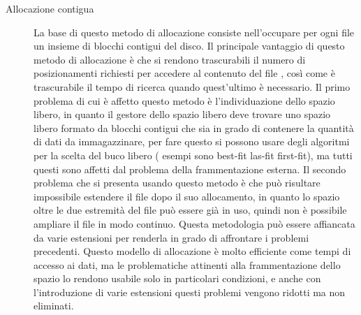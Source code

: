       \begin{description}
       \item[Allocazione contigua]
        La base di questo metodo di allocazione consiste nell'occupare per ogni file un insieme di blocchi contigui del disco. Il principale vantaggio di questo metodo di allocazione è che si rendono trascurabili il numero di posizionamenti  richiesti per accedere al contenuto del file , così come è trascurabile il tempo di ricerca quando quest'ultimo è necessario.
      Il primo problema di cui è affetto questo metodo è l'individuazione dello spazio libero, in quanto il gestore dello spazio libero deve trovare uno spazio libero formato da blocchi contigui che sia in grado di contenere la quantità di dati da immagazzinare, per fare questo si possono usare degli algoritmi per la scelta del buco libero ( esempi sono best-fit las-fit first-fit), ma tutti questi sono affetti dal problema della frammentazione esterna. 
      Il secondo problema che si presenta usando questo metodo è che può risultare impossibile estendere il file dopo il suo allocamento, in quanto lo spazio oltre le due estremità del file può essere già in uso, quindi non è possibile ampliare il file in modo continuo.
      Questa metodologia può essere affiancata da varie estensioni per renderla in grado di affrontare i problemi precedenti. 
      Questo modello di allocazione è molto efficiente come tempi di accesso ai dati, ma le problematiche attinenti alla frammentazione dello spazio lo rendono usabile solo in particolari condizioni, e anche con l'introduzione di varie estensioni questi problemi vengono ridotti ma non eliminati. 
       \end{description}

